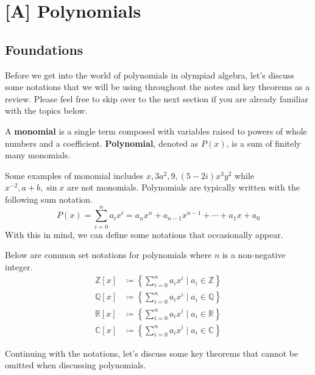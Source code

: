 \documentclass[../../main.tex]{subfiles}
\begin{document}
\chapter{[A] Polynomials}


\section{Foundations}

Before we get into the world of polynomials in olympiad algebra,
let's discuss some notations that we will be using throughout the
notes and key theorems as a review. Please feel free to skip over
to the next section if you are already familiar with the topics
below.

\begin{definition}{}{}
A \textbf{monomial} is a single term composed with variables raised
to powers of whole numbers and a coefficient. \textbf{Polynomial},
denoted as $P(x)$, is a sum of finitely many monomials.
\end{definition}

Some examples of monomial includes $x, 3a^2, 9, (5-2i)x^3y^2$ while
$x^{-2}, a + b, \sin{x}$ are not monomials. Polynomials are
typically written with the following sum notation.
\[
P(x)
= \sum_{i=0}^n a_i x^i
= a_n x^n + a_{n-1} x^{n-1} + \cdots + a_1 x + a_0
\]
With this in mind, we can define some notations that occasionally
appear.

\begin{definition}{}{}
Below are common set notations for polynomials where $n$ is a
non-negative integer.
\vspace{-0.8\baselineskip}
\begin{align*}
    \mathbb{Z}[x]
    &\coloneqq \left\{
        \sum_{i=0}^n a_i x^i \mid a_i \in \mathbb{Z}
    \right\} \\
    \mathbb{Q}[x]
    &\coloneqq \left\{
        \sum_{i=0}^n a_i x^i \mid a_i \in \mathbb{Q}
    \right\} \\
    \mathbb{R}[x]
    &\coloneqq \left\{
        \sum_{i=0}^n a_i x^i \mid a_i \in \mathbb{R}
    \right\} \\
    \mathbb{C}[x]
    &\coloneqq \left\{
        \sum_{i=0}^n a_i x^i \mid a_i \in \mathbb{C}
    \right\}
\end{align*}
\end{definition}

Continuing with the notations, let's discuss some key theorems
that cannot be omitted when discussing polynomials.
\end{document}

